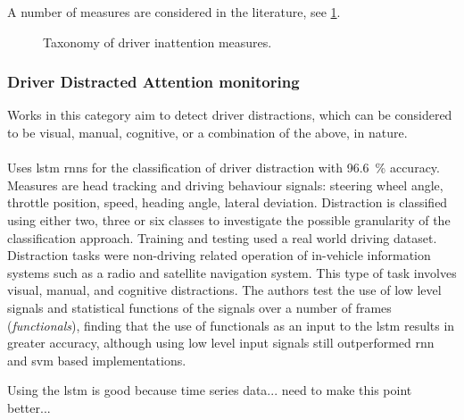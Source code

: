 \documentclass[11pt, parskip=half*,twoside=false]{scrbook}
\begin{document}
A number of measures are considered in the literature, see \cref{fig:taxonomy_measures}.

\begin{figure}
	\centering
	
	\caption{Taxonomy of driver inattention measures.}
	\label{fig:taxonomy_measures}
\end{figure}



\subsubsection{Driver Distracted Attention monitoring}

Works in this category aim to detect driver distractions, which can be considered to be visual, manual, cognitive, or a combination of the above, in nature. 

\paragraph{\citet{wollmerOnlineDriverDistraction2011}} Uses \gls{lstm} \glspl{rnn} for the classification of driver distraction with 96.6~\% accuracy. Measures are head tracking and driving behaviour signals: steering wheel angle, throttle position, speed, heading angle, lateral deviation.  Distraction is classified using either two, three or six classes to investigate the possible granularity of the classification approach. Training and testing used a real world driving dataset. Distraction tasks were non-driving related operation of in-vehicle information systems such as a radio and satellite navigation system. This type of task involves visual, manual, and cognitive distractions. The authors test the use of low level signals and statistical functions of the signals over a number of frames (\emph{functionals}), finding that the use of functionals as an input to the \gls{lstm} results in greater accuracy, although using low level input signals still outperformed \gls{rnn} and \gls{svm} based implementations.

Using the \gls{lstm} is good because time series data... need to make this point better... 
\end{document}
